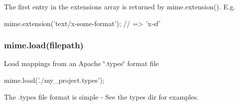 The first entry in the extensions array is returned by {\ttfamily mime.\+extension()}. E.\+g.


\begin{DoxyCode}
mime.extension('text/x-some-format'); // => 'x-sf'
\end{DoxyCode}


\subsubsection*{mime.\+load(filepath)}

Load mappings from an Apache \char`\"{}.\+types\char`\"{} format file


\begin{DoxyCode}
mime.load('./my\_project.types');
\end{DoxyCode}
 The .types file format is simple -\/ See the {\ttfamily types} dir for examples. 